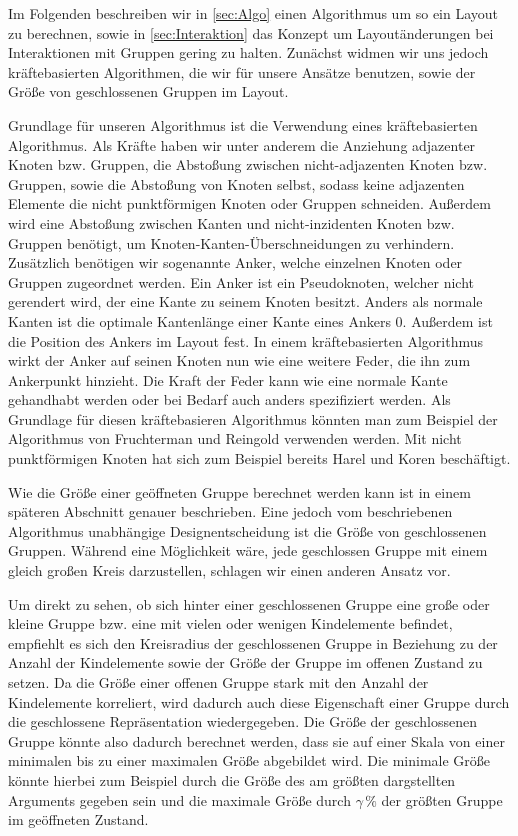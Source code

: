 Im Folgenden beschreiben wir  in \autoref{sec:Algo} einen Algorithmus um so ein Layout zu berechnen, 
sowie in \autoref{sec:Interaktion} das Konzept um Layoutänderungen bei Interaktionen mit Gruppen gering zu halten.
Zunächst widmen wir uns jedoch kräftebasierten Algorithmen, die wir für unsere Ansätze benutzen, sowie der Größe von geschlossenen Gruppen im Layout.

Grundlage für unseren Algorithmus ist die Verwendung eines kräftebasierten Algorithmus. Als Kräfte haben wir unter anderem die Anziehung adjazenter Knoten bzw. Gruppen,
die Abstoßung zwischen nicht-adjazenten Knoten bzw. Gruppen, sowie die Abstoßung von Knoten selbst, sodass keine adjazenten Elemente die nicht punktförmigen Knoten oder Gruppen schneiden. Außerdem wird eine Abstoßung zwischen Kanten und nicht-inzidenten Knoten bzw. Gruppen benötigt, um Knoten-Kanten-Überschneidungen zu verhindern.
Zusätzlich benötigen wir sogenannte Anker, welche einzelnen Knoten oder Gruppen zugeordnet werden. 
Ein Anker ist ein Pseudoknoten, welcher nicht gerendert wird, der eine Kante zu seinem Knoten besitzt. %
Anders als normale Kanten ist die optimale Kantenlänge einer Kante eines Ankers 0. Außerdem ist die Position des Ankers im Layout fest.
In einem kräftebasierten Algorithmus wirkt der Anker auf seinen Knoten nun wie eine weitere Feder, die ihn zum Ankerpunkt hinzieht.
Die Kraft der Feder kann wie eine normale Kante gehandhabt werden oder bei Bedarf auch anders spezifiziert werden.
Als Grundlage für diesen kräftebasieren Algorithmus könnten man zum Beispiel der Algorithmus von Fruchterman und Reingold \cite{SPE:SPE4380211102} verwenden werden.
Mit nicht punktförmigen Knoten hat sich zum Beispiel bereits Harel und Koren \cite{Harel:2002:DGN:1556262.1556288} beschäftigt.


Wie die Größe einer geöffneten Gruppe berechnet werden kann ist in einem späteren Abschnitt genauer beschrieben. 
Eine jedoch vom beschriebenen Algorithmus unabhängige Designentscheidung ist die Größe von geschlossenen Gruppen.
Während eine Möglichkeit wäre, jede geschlossen Gruppe mit einem gleich großen Kreis darzustellen, schlagen wir einen anderen Ansatz vor.

Um direkt zu sehen, ob sich hinter einer geschlossenen Gruppe eine große oder kleine Gruppe bzw. eine mit vielen oder wenigen Kindelemente befindet, empfiehlt es sich den Kreisradius der geschlossenen Gruppe in Beziehung zu der Anzahl der Kindelemente sowie der Größe der Gruppe im offenen Zustand zu setzen.
Da die Größe einer offenen Gruppe stark mit den Anzahl der Kindelemente korreliert, wird dadurch auch diese Eigenschaft einer Gruppe durch die geschlossene Repräsentation
wiedergegeben.
Die Größe der geschlossenen Gruppe könnte also dadurch berechnet werden, dass sie auf einer Skala von einer minimalen bis zu einer maximalen Größe abgebildet wird.
Die minimale Größe könnte hierbei zum Beispiel durch die Größe des am größten dargstellten Arguments gegeben sein und die maximale Größe durch $\gamma \,\%$ 
der größten Gruppe im geöffneten Zustand.

